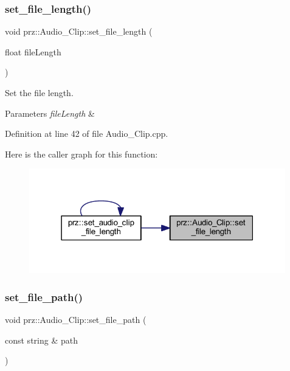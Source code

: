 \subsubsection{\texorpdfstring{set\_file\_length()}{set\_file\_length()}}
{\footnotesize\ttfamily void prz\+::\+Audio\+\_\+\+Clip\+::set\+\_\+file\+\_\+length (\begin{DoxyParamCaption}\item[{float}]{file\+Length }\end{DoxyParamCaption})}



Set the file length. 


\begin{DoxyParams}{Parameters}
{\em file\+Length} & \\
\hline
\end{DoxyParams}


Definition at line 42 of file Audio\+\_\+\+Clip.\+cpp.

Here is the caller graph for this function\+:
\nopagebreak
\begin{figure}[H]
\begin{center}
\leavevmode
\includegraphics[width=316pt]{classprz_1_1_audio___clip_ab45f2a30cf63261040e4212af3dc08d7_icgraph}
\end{center}
\end{figure}
\mbox{\label{classprz_1_1_audio___clip_aa098aaf21788bfdf5410cb1895566391}} 
\subsubsection{\texorpdfstring{set\_file\_path()}{set\_file\_path()}}
{\footnotesize\ttfamily void prz\+::\+Audio\+\_\+\+Clip\+::set\+\_\+file\+\_\+path (\begin{DoxyParamCaption}\item[{const string \&}]{path }\end{DoxyParamCaption})}




